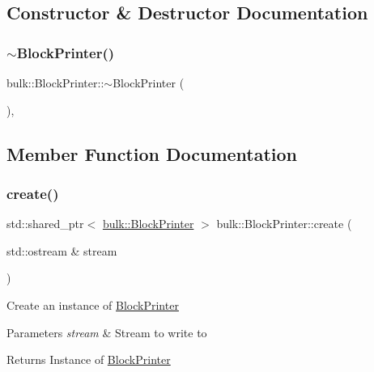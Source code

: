 \subsection{Constructor \& Destructor Documentation}
\mbox{\label{classbulk_1_1BlockPrinter_ade61ac6f7602a0ee469244c98f43bc03}} 
\subsubsection{\texorpdfstring{$\sim$\+Block\+Printer()}{~BlockPrinter()}}
{\footnotesize\ttfamily bulk\+::\+Block\+Printer\+::$\sim$\+Block\+Printer (\begin{DoxyParamCaption}{ }\end{DoxyParamCaption})\hspace{0.3cm}{\ttfamily [override]}, {\ttfamily [default]}}



\subsection{Member Function Documentation}
\mbox{\label{classbulk_1_1BlockPrinter_ad0e918167006db76007fb2520ef3d228}} 
\subsubsection{\texorpdfstring{create()}{create()}}
{\footnotesize\ttfamily std\+::shared\+\_\+ptr$<$ \hyperlink{classbulk_1_1BlockPrinter}{bulk\+::\+Block\+Printer} $>$ bulk\+::\+Block\+Printer\+::create (\begin{DoxyParamCaption}\item[{std\+::ostream \&}]{stream }\end{DoxyParamCaption})\hspace{0.3cm}{\ttfamily [static]}}

Create an instance of \hyperlink{classbulk_1_1BlockPrinter}{Block\+Printer} 
\begin{DoxyParams}{Parameters}
{\em stream} & Stream to write to \\
\hline
\end{DoxyParams}
\begin{DoxyReturn}{Returns}
Instance of \hyperlink{classbulk_1_1BlockPrinter}{Block\+Printer} 
\end{DoxyReturn}
\mbox{\label{classbulk_1_1BlockPrinter_a9f961b39d2c0bf9112524bf6773bb3e1}} 
